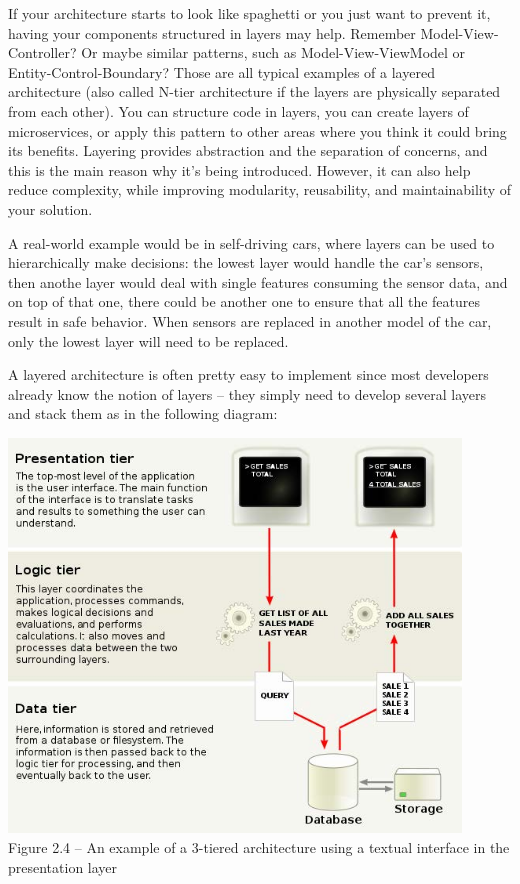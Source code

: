 

If your architecture starts to look like spaghetti or you just want to prevent it, having your components structured in layers may help. Remember Model-View-Controller? Or maybe similar patterns, such as Model-View-ViewModel or Entity-Control-Boundary? Those are all typical examples of a layered architecture (also called N-tier architecture if the layers are physically separated from each other). You can structure code in layers, you can create layers of microservices, or apply this pattern to other areas where you think it could bring its benefits. Layering provides abstraction and the separation of concerns, and this is the main reason why it's being introduced. However, it can also help reduce complexity, while improving modularity, reusability, and maintainability of your solution.

A real-world example would be in self-driving cars, where layers can be used to hierarchically make decisions: the lowest layer would handle the car's sensors, then anothe layer would deal with single features consuming the sensor data, and on top of that one, there could be another one to ensure that all the features result in safe behavior. When sensors are replaced in another model of the car, only the lowest layer will need to be replaced.

A layered architecture is often pretty easy to implement since most developers already know the notion of layers – they simply need to develop several layers and stack them as in the following diagram: 

\begin{center}
\includegraphics[width=0.9\textwidth]{content/1/chapter2/images/4.jpg}\\
Figure 2.4 – An example of a 3-tiered architecture using a textual interface in the presentation layer
\end{center}

